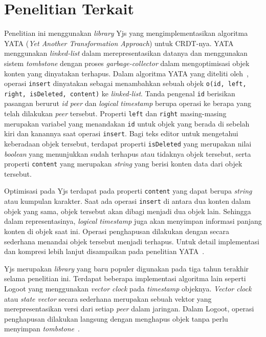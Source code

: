 \section{Penelitian Terkait}
\label{sec:penelitian_terkait}

Penelitian ini menggunakan \textit{library} Yjs yang mengimplementasikan algoritma YATA (\textit{Yet Another Transformation Approach}) untuk CRDT-nya. YATA menggunakan \textit{linked-list} dalam merepresentasikan datanya dan menggunakan sistem \textit{tombstone} dengan proses \textit{garbage-collector} dalam mengoptimisasi objek konten yang dinyatakan terhapus. Dalam algoritma YATA yang diteliti oleh~\cite{Nicolaescu2016yjs}, operasi \texttt{insert} dinyatakan sebagai menambahkan sebuah objek \texttt{o(id, left, right, isDeleted, content)} ke \textit{linked-list}. Tanda pengenal \texttt{id} berisikan pasangan berurut \textit{id} \textit{peer} dan \textit{logical timestamp} berupa operasi ke berapa yang telah dilakukan \textit{peer} tersebut. Properti \texttt{left} dan \texttt{right} masing-masing merupakan variabel yang menandakan \texttt{id} untuk objek yang berada di sebelah kiri dan kanannya saat operasi \texttt{insert}. Bagi teks editor untuk mengetahui keberadaan objek tersebut, terdapat properti \texttt{isDeleted} yang merupakan nilai \textit{boolean} yang menunjukkan sudah terhapus atau tidaknya objek tersebut, serta properti \texttt{content} yang merupakan \textit{string} yang berisi konten data dari objek tersebut.

Optimisasi pada Yjs terdapat pada properti \texttt{content} yang dapat berupa \textit{string} atau kumpulan karakter. Saat ada operasi \texttt{insert} di antara dua konten dalam objek yang sama, objek tersebut akan dibagi menjadi dua objek lain. Sehingga dalam representasinya, \textit{logical timestamp} juga akan menyimpan informasi panjang konten di objek saat ini. Operasi penghapusan dilakukan dengan secara sederhana menandai objek tersebut menjadi terhapus. Untuk detail implementasi dan kompresi lebih lanjut disampaikan pada penelitian YATA~\citep{Nicolaescu2016yjs}.

Yjs merupakan \textit{library} yang baru populer digunakan pada tiga tahun terakhir selama penelitian ini. Terdapat beberapa implementasi algoritma lain seperti Logoot yang menggunakan \textit{vector clock} pada \textit{timestamp} objeknya. \textit{Vector clock} atau \textit{state vector} secara sederhana merupakan sebuah vektor yang merepresentasikan versi dari setiap \textit{peer} dalam jaringan. Dalam Logoot, operasi penghapusan dilakukan langsung dengan menghapus objek tanpa perlu menyimpan \textit{tombstone}~\citep{weiss2009logoot}.

